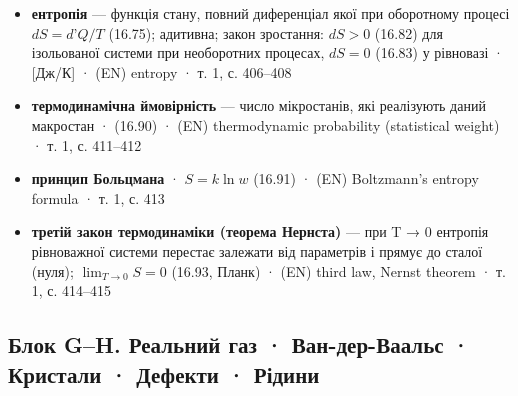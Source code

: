 \documentclass[11pt,a4paper,oneside]{book}
\newcommand{\book}{}
\begin{document}
\begin{itemize}
\item \textbf{ентропія} — функція стану, повний диференціал якої при оборотному процесі $dS = d\text{'}Q/T$ (16.75); адитивна; закон зростання: $dS > 0$ (16.82) для ізольованої системи при необоротних процесах, $dS = 0$ (16.83) у рівновазі · [Дж/К] · (EN) entropy · \book{} т. 1, с. 406–408
\item \textbf{термодинамічна ймовірність} — число мікростанів, які реалізують даний макростан · (16.90) · (EN) thermodynamic probability (statistical weight) · \book{} т. 1, с. 411–412
\item \textbf{принцип Больцмана} · $S = k\ln w$ (16.91) · (EN) Boltzmann's entropy formula · \book{} т. 1, с. 413
\item \textbf{третій закон термодинаміки (теорема Нернста)} — при T → 0 ентропія рівноважної системи перестає залежати від параметрів і прямує до сталої (нуля); $\lim_{T\to0}S = 0$ (16.93, Планк) · (EN) third law, Nernst theorem · \book{} т. 1, с. 414–415
\end{itemize}

\subsection*{Блок G–H. Реальний газ · Ван-дер-Ваальс · Кристали · Дефекти · Рідини}
\end{document}
